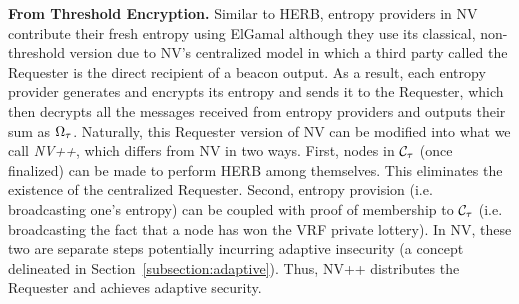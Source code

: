\noindent\textbf{From Threshold Encryption.} Similar to HERB, entropy providers in NV~\cite{nguyen2019scalable} contribute their fresh entropy using ElGamal although they use its classical, non-threshold version due to NV's centralized model in which a third party called the Requester is the direct recipient of a beacon output. As a result, each entropy provider generates and encrypts its entropy and sends it to the Requester, which then decrypts all the messages received from entropy providers and outputs their sum as $\Omega_\tau$. Naturally, this Requester version of NV can be modified into what we call \textit{NV++}, which differs from NV in two ways. First, nodes in $\mathcal{C}_\tau$ (once finalized) can be made to perform HERB among themselves. This eliminates the existence of the centralized Requester. Second, entropy provision (i.e. broadcasting one's entropy) can be coupled with proof of membership to $\mathcal{C}_\tau$ (i.e. broadcasting the fact that a node has won the VRF private lottery). In NV, these two are separate steps potentially incurring adaptive insecurity (a concept delineated in Section~\ref{subsection:adaptive}). Thus, NV++ distributes the Requester and achieves adaptive security.

